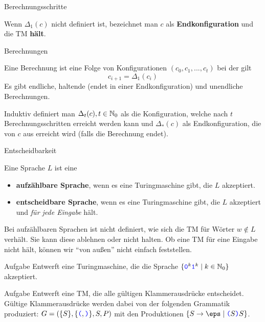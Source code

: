{\begin{frame}{Berechnungsschritte}
\begin{Definition}
			\pause
			Wenn $\Delta_1(c)$ nicht definiert ist, bezeichnet man $c$ als \textbf{Endkonfiguration} und die TM \textbf{hält}.
		\end{Definition}
	\end{frame}
	
	\begin{frame}{Berechnungen}
		\begin{Definition}
			Eine Berechnung ist eine Folge von Konfigurationen $(c_0, c_1, ..., c_t)$ bei der gilt $$c_{i+1} = \Delta_1(c_i)$$ \pause
			Es gibt endliche, haltende (endet in einer Endkonfiguration) und unendliche Berechnungen.
			\bigskip
			
			\pause
			Induktiv definiert man $\Delta_t(c) , t\in\mathbb{N}_0$ als die Konfiguration, welche nach $t$ Berechnungsschritten erreicht werden kann und $\Delta_*(c)$ als Endkonfiguration, die von $c$ aus erreicht wird (falls die Berechnung endet).
		\end{Definition}
	\end{frame}
}








\begin{frame}{Entscheidbarkeit}
	\begin{Definition}
		Eine Sprache $L$ ist eine   
		\begin{itemize}[<+->]
			\item \textbf{aufzählbare Sprache}, wenn es eine Turingmaschine gibt, die $L$ akzeptiert.
			\item \textbf{entscheidbare Sprache}, wenn es eine Turingmaschine gibt, die $L$ akzeptiert und \emph{für jede Eingabe} hält.
		\end{itemize}
	\end{Definition} \pause
	
	Bei aufzählbaren Sprachen ist nicht definiert, wie sich die TM für Wörter $ w \notin L$ verhält. Sie kann diese ablehnen oder nicht halten. Ob eine TM für eine Eingabe nicht hält, können wir \enquote{von außen} nicht einfach feststellen.
\end{frame}


\begin{frame}{Aufgabe}
	Entwerft eine Turingmaschine, die die Sprache $ \{\hbox{\textcolor{blue}{\texttt{0}}}^k\hbox{\textcolor{blue}{\texttt{1}}}^k \mid k\in \mathbb{N}_0 \} $ akzeptiert.
\end{frame}

\begin{frame}{Aufgabe}
	Entwerft eine TM, die alle gültigen Klammerausdrücke entscheidet.\\
	\medskip
	Gültige Klammerausdrücke werden dabei von der folgenden Grammatik produziert: $ G = (\{S\},\{\hbox{\textcolor{blue}{\texttt{(}}}, \hbox{\textcolor{blue}{\texttt{)}}}\}, S, P )$ mit den Produktionen $\set{ S \to \eps \mid \word (S\word )S}$.
\end{frame}

